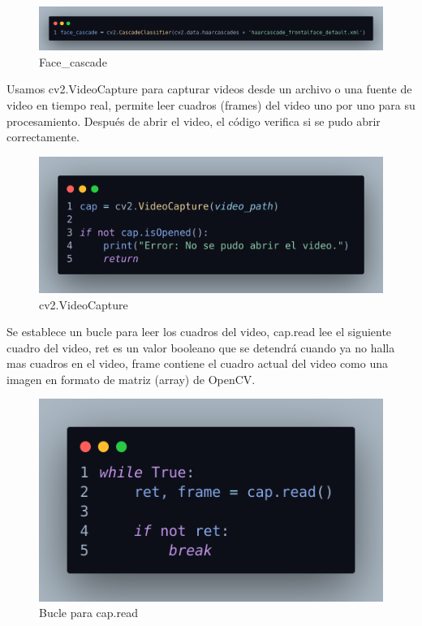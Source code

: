 \documentclass[12pt]{article}
\begin{document}
{\begin{figure}[h]
    \centering
    \includegraphics[width=1.0\linewidth]{imagenes/des05.png}
    \caption{Face\_cascade}
    \label{fig:enter-label}
\end{figure}

Usamos cv2.VideoCapture para capturar videos desde un archivo o una fuente de video en tiempo real, permite leer cuadros (frames) del video uno por uno para su procesamiento. Después de abrir el video, el código verifica si se pudo abrir correctamente.

\begin{figure}[h]
    \centering
    \includegraphics[width=0.80\linewidth]{imagenes/des06.png}
    \caption{cv2.VideoCapture}
    \label{fig:enter-label}
\end{figure}

Se establece un bucle para leer los cuadros del video, cap.read lee el siguiente cuadro del video, ret es un valor booleano que se detendrá cuando ya no halla mas cuadros en el video, frame contiene el cuadro actual del video como una imagen en formato de matriz (array) de OpenCV.

\begin{figure}[h]
    \centering
    \includegraphics[width=0.66 \linewidth]{imagenes/des07.png}
    \caption{Bucle para cap.read}
    \label{fig:enter-label}
\end{figure}

}
\end{document}

